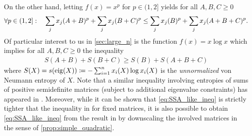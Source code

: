 \documentclass[notitlepage, 10pt]{article}
\begin{document}
On the other hand, letting $f(x) = x^p$ for $p \in (1,2]$ yields for all $A,B,C \geq 0$
\begin{equation}
    \label{eq:bouhtou_ineq_reverse}
    \forall p \in (1,2] : \quad \sum_{j}x_j(A+B)^p + \sum_{j}x_j(B+C)^p \leq \sum_{j}x_j(B)^p + \sum_{j}x_j(A+B+C)^p.
\end{equation}
Of particular interest to us in \cref{sec:large_n} is the function $f(x) = x \log x$ which implies for all $A,B,C\geq 0$ the inequality
\begin{align}
    \label{eq:SSA_like_ineq}
    S(A+B)+ S(B+C) \geq S(B) + S(A+B+C) 
\end{align}
where $S(X) = s(\operatorname{eig}(X)) \coloneqq -\sum_{i=1}^{n} x_i(X)\log x_i(X)$ is the \textit{unnormalized} von Neumann entropy of $X$.
Note that a similar inequality involving entropies of sums of positive semidefinite matrices (subject to additional eigenvalue constraints) has appeared in \cite{christandl2018recoupling}.
Moreover, while it can be shown that \cref{eq:SSA_like_ineq} is strictly tighter that the inequality in \cite{christandl2018recoupling} for fixed matrices, it is also possible to obtain \cref{eq:SSA_like_ineq} from the result in \cite{christandl2018recoupling} by downscaling the involved matrices in the sense of \cref{prop:simple_quadratic}.
\end{document}

